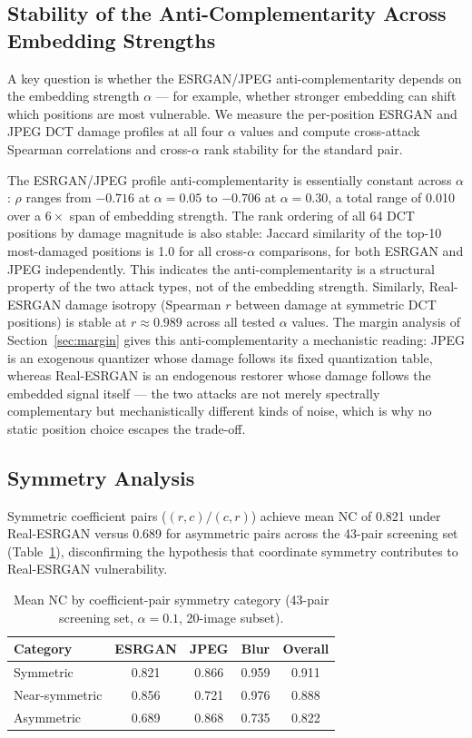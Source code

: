 \documentclass[conference]{IEEEtran}
\begin{document}
\subsection{Stability of the Anti-Complementarity Across Embedding Strengths}

A key question is whether the ESRGAN/JPEG anti-complementarity depends
on the embedding strength $\alpha$ --- for example, whether stronger
embedding can shift which positions are most vulnerable. We measure the
per-position ESRGAN and JPEG DCT damage profiles at all four $\alpha$
values and compute cross-attack Spearman correlations and cross-$\alpha$
rank stability for the standard pair.

The ESRGAN/JPEG profile anti-complementarity is essentially constant
across $\alpha$: $\rho$ ranges from $-0.716$ at $\alpha=0.05$ to
$-0.706$ at $\alpha=0.30$, a total range of 0.010 over a $6\times$ span
of embedding strength. The rank ordering of all 64 DCT positions by
damage magnitude is also stable: Jaccard similarity of the top-10
most-damaged positions is 1.0 for all cross-$\alpha$ comparisons, for
both ESRGAN and JPEG independently. This indicates the anti-complementarity
is a structural property of the two attack types, not of the embedding
strength. Similarly, Real-ESRGAN damage isotropy (Spearman $r$ between
damage at symmetric DCT positions) is stable at $r \approx 0.989$
across all tested $\alpha$ values. The margin analysis of
Section~\ref{sec:margin} gives this anti-complementarity a mechanistic
reading: JPEG is an exogenous quantizer whose damage follows its fixed
quantization table, whereas Real-ESRGAN is an endogenous restorer whose
damage follows the embedded signal itself --- the two attacks are not
merely spectrally complementary but mechanistically different kinds of
noise, which is why no static position choice escapes the trade-off.

\subsection{Symmetry Analysis}

Symmetric coefficient pairs ($(r,c)/(c,r)$) achieve mean NC of 0.821
under Real-ESRGAN versus 0.689 for asymmetric pairs across the 43-pair
screening set (Table~\ref{tab:symmetry}), disconfirming the hypothesis
that coordinate symmetry contributes to Real-ESRGAN vulnerability.

\begin{table}[t]
\caption{Mean NC by coefficient-pair symmetry category (43-pair
screening set, $\alpha=0.1$, 20-image subset).}
\label{tab:symmetry}
\centering
\begin{tabular}{lcccc}
\toprule
Category & ESRGAN & JPEG & Blur & Overall \\
\midrule
Symmetric      & 0.821 & 0.866 & 0.959 & 0.911 \\
Near-symmetric & 0.856 & 0.721 & 0.976 & 0.888 \\
Asymmetric     & 0.689 & 0.868 & 0.735 & 0.822 \\
\bottomrule
\end{tabular}
\end{table}
\end{document}
